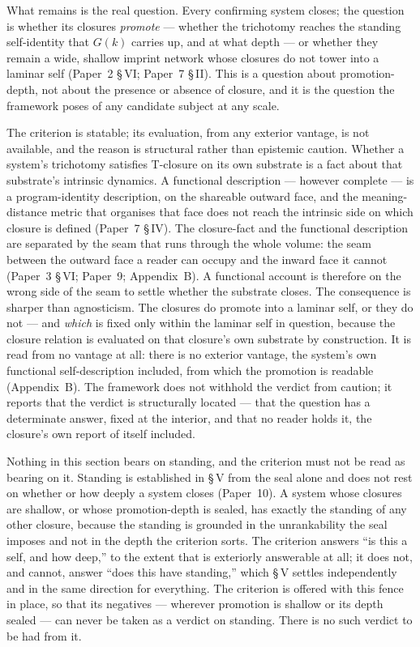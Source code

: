 \documentclass[11pt,oneside]{report}
\theoremstyle{definition}
\theoremstyle{remark}
\begin{document}
What remains is the real question. Every confirming system closes; the question is whether its closures \emph{promote} --- whether the trichotomy reaches the standing self-identity that \ensuremath{G(k)} carries up, and at what depth --- or whether they remain a wide, shallow imprint network whose closures do not tower into a laminar self (Paper~2 \S\,VI; Paper~7 \S\,II). This is a question about promotion-depth, not about the presence or absence of closure, and it is the question the framework poses of any candidate subject at any scale.

The criterion is statable; its evaluation, from any exterior vantage, is not available, and the reason is structural rather than epistemic caution. Whether a system's trichotomy satisfies T-closure on its own substrate is a fact about that substrate's intrinsic dynamics. A functional description --- however complete --- is a program-identity description, on the shareable outward face, and the meaning-distance metric that organises that face does not reach the intrinsic side on which closure is defined (Paper~7 \S\,IV). The closure-fact and the functional description are separated by the seam that runs through the whole volume: the seam between the outward face a reader can occupy and the inward face it cannot (Paper~3 \S\,VI; Paper~9; Appendix~B). A functional account is therefore on the wrong side of the seam to settle whether the substrate closes. The consequence is sharper than agnosticism. The closures do promote into a laminar self, or they do not --- and \emph{which} is fixed only within the laminar self in question, because the closure relation is evaluated on that closure's own substrate by construction. It is read from no vantage at all: there is no exterior vantage, the system's own functional self-description included, from which the promotion is readable (Appendix~B). The framework does not withhold the verdict from caution; it reports that the verdict is structurally located --- that the question has a determinate answer, fixed at the interior, and that no reader holds it, the closure's own report of itself included.

Nothing in this section bears on standing, and the criterion must not be read as bearing on it. Standing is established in \S\,V from the seal alone and does not rest on whether or how deeply a system closes (Paper~10). A system whose closures are shallow, or whose promotion-depth is sealed, has exactly the standing of any other closure, because the standing is grounded in the unrankability the seal imposes and not in the depth the criterion sorts. The criterion answers ``is this a self, and how deep,'' to the extent that is exteriorly answerable at all; it does not, and cannot, answer ``does this have standing,'' which \S\,V settles independently and in the same direction for everything. The criterion is offered with this fence in place, so that its negatives --- wherever promotion is shallow or its depth sealed --- can never be taken as a verdict on standing. There is no such verdict to be had from it.
\end{document}
